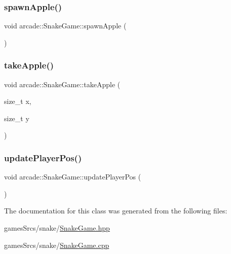 \mbox{\label{classarcade_1_1_snake_game_ae35a0091366ec46ab795642ea40d67b9}} 
\subsubsection{\texorpdfstring{spawn\+Apple()}{spawnApple()}}
{\footnotesize\ttfamily void arcade\+::\+Snake\+Game\+::spawn\+Apple (\begin{DoxyParamCaption}{ }\end{DoxyParamCaption})}

\mbox{\label{classarcade_1_1_snake_game_a5b9b4898677db2d24f993bac6f25c49e}} 
\subsubsection{\texorpdfstring{take\+Apple()}{takeApple()}}
{\footnotesize\ttfamily void arcade\+::\+Snake\+Game\+::take\+Apple (\begin{DoxyParamCaption}\item[{size\+\_\+t}]{x,  }\item[{size\+\_\+t}]{y }\end{DoxyParamCaption})}

\mbox{\label{classarcade_1_1_snake_game_a251558fddc91c0e15d10f413a2633994}} 
\subsubsection{\texorpdfstring{update\+Player\+Pos()}{updatePlayerPos()}}
{\footnotesize\ttfamily void arcade\+::\+Snake\+Game\+::update\+Player\+Pos (\begin{DoxyParamCaption}{ }\end{DoxyParamCaption})}



The documentation for this class was generated from the following files\+:\begin{DoxyCompactItemize}
\item 
games\+Srcs/snake/\hyperlink{_snake_game_8hpp}{Snake\+Game.\+hpp}\item 
games\+Srcs/snake/\hyperlink{_snake_game_8cpp}{Snake\+Game.\+cpp}\end{DoxyCompactItemize}
